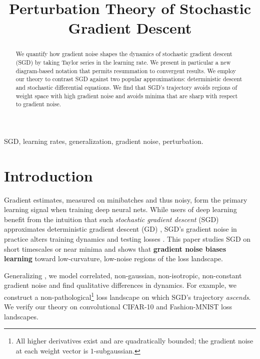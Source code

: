 \documentclass[anon,12pt]{colt2021} %
\title[A Perturbative Analysis of SGD at Small Learning Rates]{
    Perturbation Theory of Stochastic Gradient Descent 
}
\begin{document}
    \maketitle
    
    \begin{abstract}%
        We quantify how gradient noise shapes the dynamics of stochastic
        gradient descent (SGD) by taking Taylor series in the learning rate.
        We present in particular a new diagram-based notation that permits
        resummation to convergent results.
        We employ our theory to contrast SGD against two popular
        approximations: deterministic descent and stochastic differential
        equations.  We find that SGD's trajectory avoids regions of weight
        space with high gradient noise and avoids minima that are sharp with
        respect to gradient noise.
    \end{abstract}
    
    \begin{keywords}%
        SGD, learning rates, generalization, gradient noise, perturbation. 
    \end{keywords}

    \section{Introduction}\label{sect:intro}


            Gradient estimates, measured on minibatches and thus noisy, form
            the primary learning signal when training deep neural nets.  While
            users of deep learning benefit from the intuition that such
            \emph{stochastic gradient descent} (SGD) approximates deterministic
            gradient descent (GD) \citep{bo91,le15}, SGD's gradient noise in
            practice alters training dynamics and testing losses
            \citep{go18, %
            wu20}.  This paper studies SGD on
            short timescales or near minima and shows that \textbf{gradient
            noise biases learning} toward low-curvature, low-noise regions of
            the loss landscape.

            Generalizing \cite{li18,we19b,zh19}, we model correlated,
            non-gaussian, non-isotropic, non-constant gradient noise and
            find qualitative differences in dynamics.  For example, we
            construct a non-pathological\footnote{%
                All higher derivatives exist and are quadratically bounded; the
                gradient noise at each weight vector is $1$-subgaussian.%
            } loss landscape on which SGD's trajectory
            \emph{ascends}.
            We
            verify our theory on convolutional CIFAR-10 and Fashion-MNIST loss
            landscapes.
\end{document}
